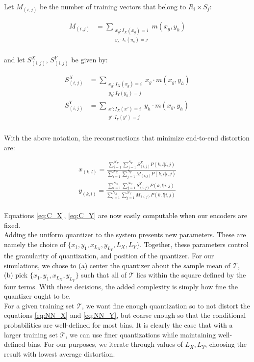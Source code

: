 Let $M_{(i,j)}$ be the number of training vectors that belong to $R_i\times S_j$:

\begin{align}
    M_{(i,j)} &=
    \sum_{\substack{x_g:I_X(x_g)=i\\y_h:I_Y(y_h)=j}}m(x_g,y_h)
\end{align}
\\
and let $S_{(i,j)}^X$, $S_{(i,j)}^Y$ be given by:

\begin{align}
    S^X_{(i,j)} &=
    \sum_{\substack{x_g:I_X(x_g)=i\\y_h:I_Y(y_h)=j}}x_g\cdot m(x_g,y_h)\\
    S^Y_{(i,j)} &=
    \sum_{\substack{x':I_X(x')=i\\y':I_Y(y')=j}}y_h\cdot m(x_g,y_h)
\end{align}
\\
With the above notation, the reconstructions that minimize end-to-end distortion are:

\begin{align}
    \label{eq:C_X}
    x_{(k,l)} = 
        \frac{\sum_{i=1}^{N_X} \sum_{j=1}^{N_Y}
        S_{(i,j)}^X P(k,l|i,j)}
        {\sum_{i=1}^{N_X} \sum_{j=1}^{N_Y}
        M_{(i,j)} P(k,l|i,j)}\\
    \label{eq:C_Y}
    y_{(k,l)} = 
        \frac{\sum_{i=1}^{N_X} \sum_{j=1}^{N_Y}
        S_{(i,j)}^Y P(k,l|i,j)}
        {\sum_{i=1}^{N_X} \sum_{j=1}^{N_Y}
        M_{(i,j)} P(k,l|i,j)}
\end{align}
\\
Equations \eqref{eq:C_X}, \eqref{eq:C_Y} are now easily computable when our encoders are fixed.\\

Adding the uniform quantizer to the system presents new parameters. These are namely the choice of $\{x_1, y_1, x_{L_X}, y_{L_Y}, L_X, L_Y\}$. Together, these parameters control the granularity of quantization, and position of the quantizer. For our simulations, we chose to (a) center the quantizer about the sample mean of $\mathcal T$, (b) pick $\{x_1, y_1, x_{L_X}, y_{L_Y}\}$ such that all of $\mathcal T$ lies within the square defined by the four terms. With these decisions, the added complexity is simply how fine the quantizer ought to be.\\

For a given training set $\mathcal T$, we want fine enough quantization so to not distort the equations \eqref{eq:NN_X} and \eqref{eq:NN_Y}, but coarse enough so that the conditional probabilities are well-defined for most bins. It is clearly the case that with a larger training set $\mathcal T$, we can use finer quantizations while maintaining well-defined bins. For our purposes, we iterate through values of $L_X, L_Y$, choosing the result with lowest average distortion.\\

